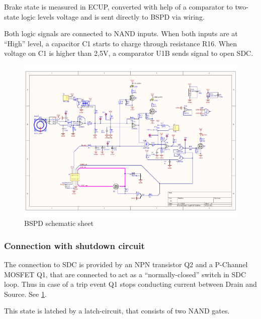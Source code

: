 Brake state is measured in ECUP, converted with help of a comparator to two-state logic levels
voltage and is sent directly to BSPD via wiring.

Both logic signals are connected to NAND inputs. When both inputs are at “High” level, a
capacitor C1 starts to charge through resistance R16. When voltage on C1 is higher than 2,5V, a
comparator U1B sends signal to open SDC.

\begin{figure}[H]
	\centering
	\includegraphics[width=\textwidth]{./img/bspd-schematic.pdf}
	\caption{BSPD schematic sheet}
	\label{fig:BSPD-schematic}
\end{figure}

\subsubsection{Connection with shutdown circuit}
The connection to SDC is provided by an NPN transistor Q2 and a P-Channel MOSFET Q1, that
are connected to act as a “normally-closed” switch in SDC loop. Thus in case of a trip event Q1
stops conducting current between Drain and Source. See \ref{fig:BSPD-schematic}.

This state is latched by a latch-circuit, that consists of two NAND gates.

